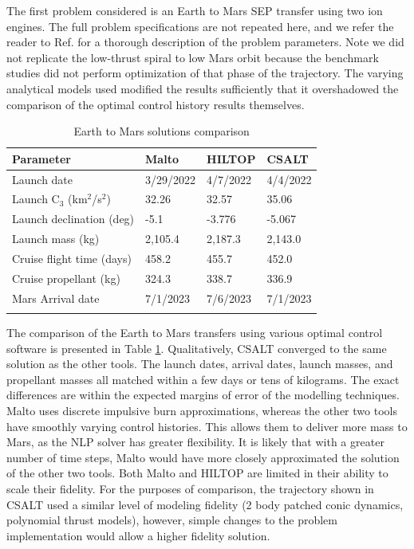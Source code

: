 \documentclass[ISTS  ]{tjsass} %
\newcommand{\bhline}[1]{\noalign{\hrule height #1}}
\begin{document}
The first problem considered is an Earth to Mars SEP transfer using two ion engines. The full problem specifications are not repeated here, and we refer the reader to Ref.  for a thorough description of the problem parameters. Note we did not replicate the low-thrust spiral to low Mars orbit because the benchmark studies did not perform optimization of that phase of the trajectory. The varying analytical models used modified the results sufficiently that it overshadowed the comparison of the optimal control history results themselves.
%
\begin{table}
	\centering
	\caption{Earth to Mars solutions comparison}
	\label{table:mars_comparison}
	\begin{tabularx}{\columnwidth}{lXXX}\bhline{.8pt}
		\textbf{Parameter} & \textbf{Malto} & \textbf{HILTOP} & \textbf{CSALT} \\\hline
		Launch date & 3/29/2022 & 4/7/2022 & 4/4/2022\\
		Launch C$_3$ (km$^2$/s$^2$) & 32.26 & 32.57 & 35.06\\
		Launch declination (deg) & -5.1 & -3.776 & -5.067\\
		Launch mass (kg) & 2,105.4 & 2,187.3 & 2,143.0\\
		Cruise flight time (days) & 458.2 & 455.7 & 452.0\\
		Cruise propellant (kg) & 324.3 & 338.7 & 336.9\\
		Mars Arrival date & 7/1/2023 & 7/6/2023 & 7/1/2023\\\bhline{.8pt}
	\end{tabularx}
\end{table}

The comparison of the Earth to Mars transfers using various optimal control software is presented in Table \ref{table:mars_comparison}. Qualitatively, CSALT converged to the same solution as the other tools. The launch dates, arrival dates, launch masses, and propellant masses all matched within a few days or tens of kilograms. The exact differences are within the expected margins of error of the modelling techniques. Malto uses discrete impulsive burn approximations, whereas the other two tools have smoothly varying control histories. This allows them to deliver more mass to Mars, as the NLP solver has greater flexibility. It is likely that with a greater number of time steps, Malto would have more closely approximated the solution of the other two tools. Both Malto and HILTOP are limited in their ability to scale their fidelity. For the purposes of comparison, the trajectory shown in CSALT used a similar level of modeling fidelity (2 body patched conic dynamics, polynomial thrust models), however, simple changes to the problem implementation would allow a higher fidelity solution.
\end{document}
